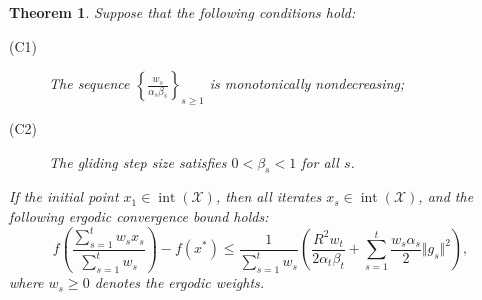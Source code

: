 \documentclass[sn-mathphys]{JORSC-jnl}%
\theoremstyle{thmstyleone}%
\newtheorem{theorem}{Theorem}[section]%
\theoremstyle{thmstylethree}%
\begin{document}

\begin{theorem}\label{thm2}
	Suppose that the following conditions hold:
	\begin{description}
		\item[(C1)] The sequence $\left\{ \frac{w_s}{\alpha_s \beta_s} \right\}_{s \ge 1}$ is monotonically nondecreasing;
		\item[(C2)] The gliding step size satisfies $0 < \beta_s < 1$ for all $s$.
	\end{description}
	If the initial point $x_1 \in \operatorname{int}(\mathcal{X})$, then all iterates $x_s \in \operatorname{int}(\mathcal{X})$, and the following ergodic convergence bound holds:
	\begin{equation}\label{Convergence}
		f\left( \frac{\sum_{s=1}^t w_s x_s}{\sum_{s=1}^t w_s} \right) - f(x^*)
		\leq \frac{1}{\sum_{s=1}^{t}w_s}
		\left(
		\frac{R^2 w_t}{2 \alpha_t \beta_t}
		+ \sum_{s=1}^{t} \frac{w_s \alpha_s}{2} \Vert g_s \Vert^2
		\right),
	\end{equation}
	where $w_s \ge 0$ denotes the ergodic weights.
\end{theorem}
\end{document}
